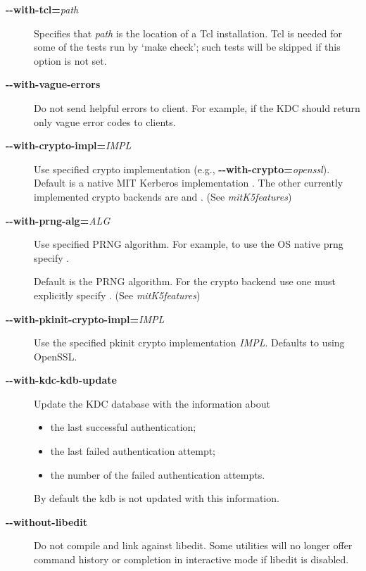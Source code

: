 \documentclass[letterpaper,10pt,english]{sphinxmanual}
\begin{document}
\begin{description}
\item[{\textbf{-}\textbf{-with-tcl=}\emph{path}}] \leavevmode
Specifies that \emph{path} is the location of a Tcl installation.
Tcl is needed for some of the tests run by `make check'; such tests
will be skipped if this option is not set.

\item[{\textbf{-}\textbf{-with-vague-errors}}] \leavevmode
Do not send helpful errors to client.  For example, if the KDC
should return only vague error codes to clients.

\item[{\textbf{-}\textbf{-with-crypto-impl=}\emph{IMPL}}] \leavevmode
Use specified crypto implementation (e.g., \textbf{-}\textbf{-with-crypto=}\emph{openssl}).  Default is a native MIT Kerberos implementation
.  The other currently implemented crypto backends are
 and .  (See \emph{mitK5features})

\item[{\textbf{-}\textbf{-with-prng-alg=}\emph{ALG}}] \leavevmode
Use specified PRNG algorithm.  For example, to use the OS native
prng specify .

Default is the  PRNG algorithm.  For the  crypto
backend use one must explicitly specify .
(See \emph{mitK5features})

\item[{\textbf{-}\textbf{-with-pkinit-crypto-impl=}\emph{IMPL}}] \leavevmode
Use the specified pkinit crypto implementation \emph{IMPL}.
Defaults to using OpenSSL.

\item[{\textbf{-}\textbf{-with-kdc-kdb-update}}] \leavevmode
Update the KDC database with the information about
\begin{itemize}
\item {} 
the last successful authentication;

\item {} 
the last failed authentication attempt;

\item {} 
the number of the failed authentication attempts.

\end{itemize}

By default the kdb is not updated with this information.

\item[{\textbf{-}\textbf{-without-libedit}}] \leavevmode
Do not compile and link against libedit.  Some utilities will no
longer offer command history or completion in interactive mode if
libedit is disabled.


\end{description}
\end{document}
